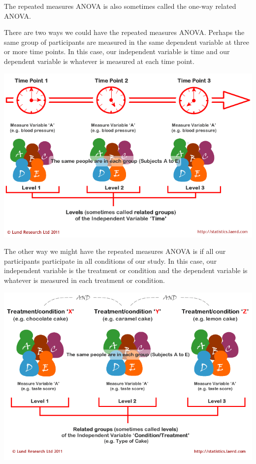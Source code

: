 \documentclass[
]{book}
\begin{document}
The repeated measures ANOVA is also sometimes called the one-way related ANOVA.

There are two ways we could have the repeated measures ANOVA. Perhaps the same group of participants are measured in the same dependent variable at three or more time points. In this case, our independent variable is time and our dependent variable is whatever is measured at each time point.

\includegraphics{images/05-repeated-measures-anova/Laerd1.png}

The other way we might have the repeated measures ANOVA is if all our participants participate in all conditions of our study. In this case, our independent variable is the treatment or condition and the dependent variable is whatever is measured in each treatment or condition.

\includegraphics{images/05-repeated-measures-anova/Laerd2.png}
\end{document}
